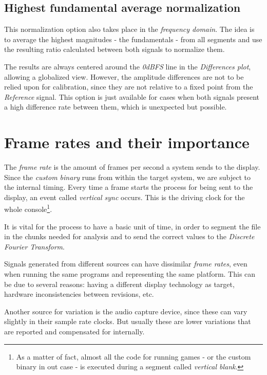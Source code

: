 \documentclass[10pt,a4paper]{report}
\begin{document}
\begin{appendices}
\section{Highest fundamental average normalization}

This normalization option also takes place in the \textit{frequency domain}. The idea is to average the highest magnitudes - the fundamentals - from all segments and use the resulting ratio calculated between both signals to normalize them.

The results are always centered around the \textit{0dBFS} line in the \textit{Differences plot}, allowing a globalized view. However, the amplitude differences are not to be relied upon for calibration, since they are not relative to a fixed point from the \textit{Reference} signal. This option is just available for cases when both signals present a high difference rate between them, which is unexpected but possible.

\chapter{Frame rates and their importance}
\label{framerate}

The \textit{frame rate} is the amount of frames per second a system sends to the display. Since the \textit{custom binary} runs from within the target system, we are subject to the internal timing. Every time a frame starts the process for being sent to the display, an event called \textit{vertical sync} occurs. This is the driving clock for the whole console\footnote{As a matter of fact, almost all the code for running games - or the custom binary in out case - is executed during a segment called \textit{vertical blank}.}.

It is vital for the process to have a basic unit of time, in order to segment the file in the chunks needed for analysis and to send the correct values to the \textit{Discrete Fourier Transform}.

Signals generated from different sources can have dissimilar \textit{frame rates}, even when running the same programs and representing the same platform. This can be due to several reasons: having a different display technology as target, hardware inconsistencies between revisions, etc.

Another source for variation is the audio capture device, since these can vary slightly in their sample rate clocks. But usually these are lower variations that are reported and compensated for internally.


\end{appendices}
\end{document}
